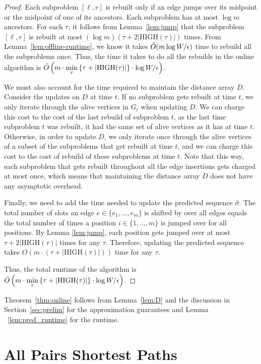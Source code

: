 \documentclass[11pt]{article}
\begin{document}
\begin{proof}
    Each subproblem $[\ell,r]$ is rebuilt only if an edge jumps over its midpoint or the midpoint of one of its ancestors.
    Each subproblem has at most $\log m$ ancestors. 
    For each $\tau$, it follows from Lemma~\ref{lem:jump} that the subproblem $[\ell,r]$ is rebuilt at most $(\log m)(\tau + 2|\text{HIGH}(\tau)|)$ times.
    From Lemma~\ref{lem:offline-runtime}, we know it takes $\Tilde{O}(m \log W/ \epsilon)$ time to rebuild all the subproblems once. 
    Thus, the time it takes to do all the rebuilds in the online algorithm is
    $\Tilde{O}\left(m \cdot \min\limits_{\tau} \left\{\tau + |\text{HIGH}(\tau)|\right\}\cdot \log W / \epsilon \right)$.
    
    We must also account for the time required to maintain the distance array $D$.  
    Consider the updates on $D$ at time $t$. 
    If no subproblem gets rebuilt at time $t$, we only iterate through the alive vertices in $G_t$ when updating $D$. We can charge this cost to the cost of the last rebuild of subproblem $t$, as the last time subproblem $t$ was rebuilt, it had the same set of alive vertices as it has at time $t$. 
    Otherwise, in order to update $D$, we only iterate once through the alive vertices of a subset of the subproblems that get rebuilt at time $t$, and we can charge this cost to the cost of rebuild of these subproblems at time $t$. Note that this way, each subproblem that gets rebuilt throughout all the edge insertions gets charged at most once, which means that maintaining the distance array $D$ does not have any asymptotic overhead.
    
    Finally, we need to add the time needed to update the predicted sequence $\hat{\sigma}$. The total number of slots an edge $e \in \{e_1, \ldots, e_m\}$ is shifted by over all edges equals the total number of times a position $i \in \{1, \ldots, m\}$ is jumped over for all positions.  By Lemma \ref{lem:jump}, each position gets jumped over at most $\tau + 2|\text{HIGH}(\tau)|$ times for any $\tau$. Therefore, updating the predicted sequence takes $O(m \cdot (\tau + |\text{HIGH}(\tau)|))$ time for any $\tau$.
        
    Thus, the total runtime of the algorithm is $\Tilde{O}\left(m \cdot \min\limits_{\tau} \left\{\tau + |\text{HIGH}(\tau)|\right\}\cdot \log W / \epsilon \right)$.
\end{proof}

Theorem~\ref{thm:online} follows from  Lemma~\ref{lem:D} and the discussion in Section~\ref{sec:prelim} for the approximation guarantees and Lemma ~\ref{lem:pred_runtime} for the runtime. \section{All Pairs Shortest Paths}
\end{document}
